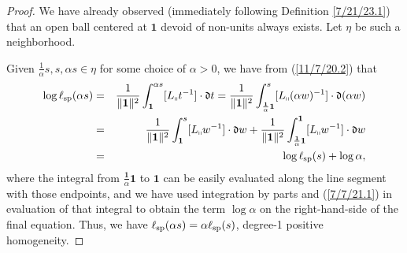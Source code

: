 \documentclass{amsart}
\numberwithin{equation}{section}
\theoremstyle{definition}
\numberwithin{theorem}{section}
\begin{document}
\begin{proof} We have already observed (immediately following Definition \ref{7/21/23.1}) that an open ball centered at $\mathbf{1}$ devoid of non-units always exists.  Let $\eta$  be such a neighborhood.

Given $\frac{1}{\alpha}s,s,\alpha s\in\eta$ for some choice of $\alpha>0$, we have from (\ref{11/7/20.2}) that
\begin{eqnarray}\nonumber  \log\ell_{\rm sp}(\alpha s) &=&  \frac{1}{\|{\bf 1}\|^2}\int_{\bf 1}^{\alpha s} [L_{\shortparallel}t^{-1}]\cdot \mathfrak{d}t = \frac{1}{\|{\bf 1}\|^2}\int_{\frac{\mathbf{1}}{\alpha}\mathbf{1}}^{s} [L_{\shortparallel}(\alpha w)^{-1}]\cdot \mathfrak{d}(\alpha w)  \\ \nonumber &=&  \frac{1}{\|{\bf 1}\|^2}\int_{\mathbf{1}}^{s} [L_{\shortparallel}w^{-1}]\cdot \mathfrak{d}w + \frac{1}{\|{\bf 1}\|^2}\int_{\frac{\mathbf{1}}{\alpha} \mathbf{1}}^{\mathbf{1}} [L_{\shortparallel}w^{-1}]\cdot \mathfrak{d}w  \\ &=& \log \ell_{\rm sp}(s) + \log\alpha, \label{4/2/23.1}
\end{eqnarray} where the integral from $\frac{\mathbf{1}}{\alpha} \mathbf{1}$ to $\mathbf{1}$ can be easily evaluated along the line segment with those endpoints, and we have used integration by parts and  (\ref{7/7/21.1}) in evaluation of that integral to  obtain the term $\log \alpha$ on the right-hand-side of the final equation.  Thus, we have $\ell_{\rm sp}(\alpha s) = \alpha\ell_{\rm sp}(s)$, degree-1 positive homogeneity.



\end{proof}
\end{document}
